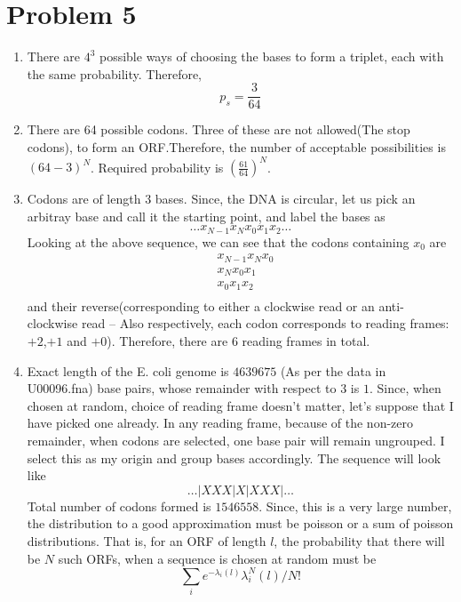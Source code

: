 \documentclass[a4paper]{article}
\begin{document}
\section{Problem 5}
\begin{enumerate}[label=(\alph*)]
    \item There are $4^3$ possible ways of choosing the bases to form a triplet, each with the same probability. Therefore, $$p_{s}=\frac{3}{64}$$
	\item There are 64 possible codons. Three of these are not allowed(The stop codons), to form an ORF.Therefore, the number of acceptable possibilities is $(64-3)^{N}$.\newline
	Required probability is $\left(\frac{61}{64}\right)^{N}$.
	\item Codons are of length $3$ bases. Since, the DNA is circular, let us pick an arbitray base and call it the starting point, and label the bases as $$\dots x_{N-1}x_{N}x_{0}x_{1}x_{2}\dots$$
    Looking at the above sequence, we can see that the codons containing $x_{0}$ are
    \begin{align*}
        & x_{N-1}x_{N}x_{0} \\
        & x_{N}x_{0}x_{1} \\
        & x_{0}x_{1}x_{2} \\
    \end{align*} and their reverse(corresponding to either a clockwise read or an anti-clockwise read -- Also respectively, each codon corresponds to reading frames: $+2$,$+1$ and $+0$). Therefore, there are $6$ reading frames in total. 
    \item Exact length of the E. coli genome is $4639675$ (As per the data in U00096.fna) base pairs, whose remainder with respect to $3$ is $1$. \newline
     Since, when chosen at random, choice of reading frame doesn't matter, let's suppose that I have picked one already. In any reading frame, because of the non-zero remainder, when codons are selected, one base pair will remain ungrouped. I select this as my origin and group bases accordingly. The sequence will look like
    $$  \dots |X X X|X |X X X| \dots $$
    Total number of codons formed is $1546558$. 
    Since, this is a very large number, the distribution to a good approximation must be poisson or a sum of poisson distributions. That is, for an ORF of length $l$, the probability that there will be $N$ such ORFs, when a sequence is chosen at random must be 
    $$\sum_{i} e^{-\lambda_{i} (l)}\lambda^{N}_{i}(l)/N!$$


\end{enumerate}
\end{document}
